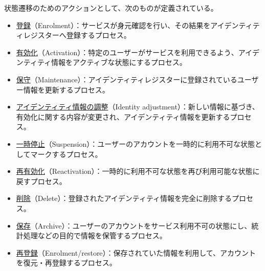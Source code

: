 \documentclass[uplatex]{jsarticle}
\def\label#1{}%
\begin{document}
\begin{dfn}[アイデンティティライフサイクルのアクション]\label{dfn:ch3-lifecycle-actions}
状態遷移のためのアクションとして、次のものが定義されている。
\begin{itemize}
\item \underline{登録}（Enrolment）：サービスが身元確認を行い、その結果をアイデンティティレジスターへ登録するプロセス。
\item \underline{有効化}（Activation）：特定のユーザーがサービスを利用できるよう、アイデンティティ情報をアクティブな状態にするプロセス。
\item \underline{保守}（Maintenance）：アイデンティティレジスターに登録されているユーザー情報を更新するプロセス。
\item \underline{アイデンティティ情報の調整}（Identity adjustment）：新しい情報に基づき、有効化に関する内容が変更され、アイデンティティ情報を更新するプロセス。
\item \underline{一時停止}（Suspension）：ユーザーのアカウントを一時的に利用不可な状態としてマークするプロセス。
\item \underline{再有効化}（Reactivation）：一時的に利用不可な状態を再び利用可能な状態に戻すプロセス。
\item \underline{削除}（Delete）：登録されたアイデンティティ情報を完全に削除するプロセス。
\item \underline{保存}（Archive）：ユーザーのアカウントをサービス利用不可の状態にし、統計処理などの目的で情報を保管するプロセス。
\item \underline{再登録}（Enrolment/restore）：保存されていた情報を利用して、アカウントを復元・再登録するプロセス。
\end{itemize}
\end{dfn}
\end{document}
